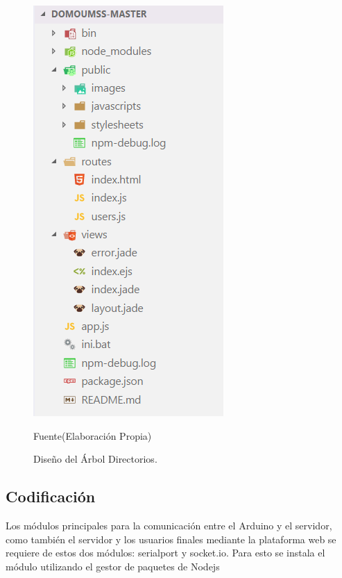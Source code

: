 \documentclass[11pt,letterpaper]{report}
\begin{document}
		\begin{figure}[ht]
		\centering
		\includegraphics[scale=0.7]{imagenes/arbol_directorios.png}
		\caption{Diseño del Árbol Directorios.}
					Fuente(Elaboración Propia)
		\label{arbol_directorios} 
		\end{figure}

	\subsection{Codificación}
	Los módulos principales para la comunicación entre el Arduino y el servidor, como también el servidor y los usuarios finales mediante la plataforma web  se requiere de estos dos módulos: serialport y socket.io. Para esto se instala el módulo utilizando el gestor de paquetes de Nodejs 
\end{document}
